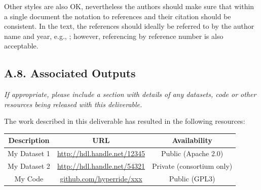 Other styles are also OK, nevertheless the authors should make sure that within a single document the notation to references and their citation should be consistent. In the text, the references should ideally be referred to by the author name and year, e.g., \cite{bib:lamport1994}; however, referencing by reference number is also acceptable.

\subsection*{A.8. Associated Outputs}
\label{sec:appendix-a8-associated-outputs}

\textit{If appropriate, please include a section with details of any datasets, code or other resources being released with this deliverable.}

The work described in this deliverable has resulted in the following resources:

\begin{center}
	\def\arraystretch{1.25}		
	\begin{tabular}{|c|c|c|}
		\hline
		\rowcolor{hyperridegray}
		\color{white} Description & 
		\color{white} URL & 
		\color{white} Availability 
		\\\hline
		
		\rowcolor{white}\color{hyperridefont} 
		My Dataset 1 &  
		\url{http://hdl.handle.net/12345} &
		Public (Apache 2.0) \\
		
		\rowcolor{hyperridelightergray}\color{hyperridefont} 
		My Dataset 2 &  
		\url{http://hdl.handle.net/54321} &
		Private (consortium only) \\
		
		\rowcolor{white}\color{hyperridefont} 
		My Code &  
		\url{github.com/hyperride/xxx} &
		Public (GPL3) \\
		
		\hline
	\end{tabular}
\end{center}

